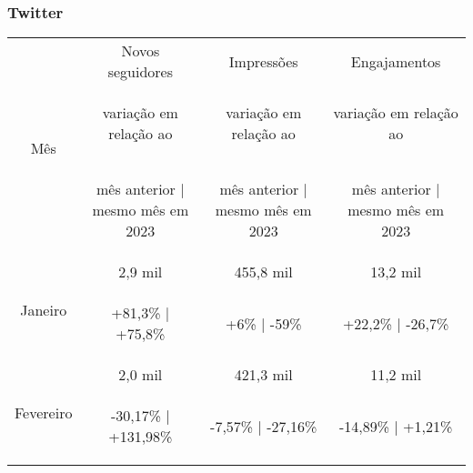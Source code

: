 \documentclass{article}%
\begin{document}
\subsubsection*{Twitter}%
\label{ssubsec:Twitter}%
\begin{minipage}{\textwidth}%
\centering%
\begin{tabular}{@{}|c|c|c|c|@{}}%
\toprule%
\multirow{3}{*}{Mês}&Novos seguidores&Impressões&Engajamentos\\%
&\begin{footnotesize}%
variação em relação ao%
\end{footnotesize}&\begin{footnotesize}%
variação em relação ao%
\end{footnotesize}&\begin{footnotesize}%
variação em relação ao%
\end{footnotesize}\\%
&\begin{footnotesize}%
mês anterior | mesmo mês em 2023%
\end{footnotesize}&\begin{footnotesize}%
mês anterior | mesmo mês em 2023%
\end{footnotesize}&\begin{footnotesize}%
mês anterior | mesmo mês em 2023%
\end{footnotesize}\\%
\midrule%
\multirow{2}{*}{Janeiro}&2,9 mil&455,8 mil&13,2 mil\\%
&\begin{footnotesize}%
+81,3\% | +75,8\%%
\end{footnotesize}&\begin{footnotesize}%
+6\% | {-}59\%%
\end{footnotesize}&\begin{footnotesize}%
+22,2\% | {-}26,7\%%
\end{footnotesize}\\%
\midrule%
\multirow{2}{*}{Fevereiro}&2,0 mil&421,3 mil&11,2 mil\\%
&\begin{footnotesize}%
{-}30,17\% | +131,98\%%
\end{footnotesize}&\begin{footnotesize}%
{-}7,57\% | {-}27,16\%%
\end{footnotesize}&\begin{footnotesize}%
{-}14,89\% | +1,21\%%
\end{footnotesize}\\\bottomrule%
%
\end{tabular}%
\end{minipage}%
\end{document}

